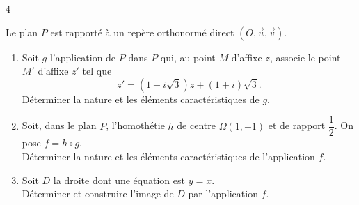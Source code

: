 \documentclass{axiobac}
\begin{document}
\begin{exercice}{4}

Le plan $P$ est rapporté à un repère orthonormé direct $(O, \vec{u}, \vec{v})$.

\begin{enumerate}
    \item Soit $g$ l'application de $P$ dans $P$ qui, au point $M$ d'affixe $z$, associe le point $M'$ d'affixe $z'$ tel que
    \[
    z' = \left(1 - i\sqrt{3}\right) z + (1 + i)\sqrt{3} .
    \]
    Déterminer la nature et les éléments caractéristiques de $g$.
    \item Soit, dans le plan $P$, l'homothétie $h$ de centre $\Omega(1, -1)$ et de rapport $\dfrac{1}{2}$. On pose $f = h \circ g$. \\
    Déterminer la nature et les éléments caractéristiques de l'application $f$.
    \item Soit $D$ la droite dont une équation est $y = x$. \\
    Déterminer et construire l'image de $D$ par l'application $f$.
\end{enumerate}

\end{exercice}
\end{document}

